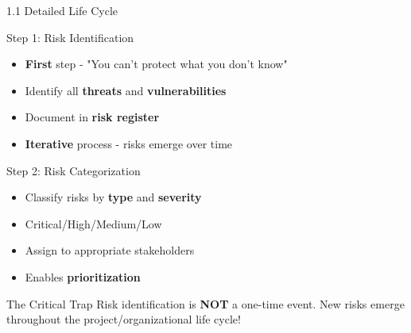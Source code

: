 \documentclass[9pt]{beamer}  %
\begin{document}
	\begin{frame}{1.1 Detailed Life Cycle}
		\begin{block}{Step 1: Risk Identification}
			\begin{itemize}
				\item \textbf{First} step - "You can't protect what you don't know"
				\item Identify all \textbf{threats} and \textbf{vulnerabilities}
				\item Document in \textbf{risk register}
				\item \textbf{Iterative} process - risks emerge over time
			\end{itemize}
		\end{block}
		
		\begin{block}{Step 2: Risk Categorization}
			\begin{itemize}
				\item Classify risks by \textbf{type} and \textbf{severity}
				\item Critical/High/Medium/Low
				\item Assign to appropriate stakeholders
				\item Enables \textbf{prioritization}
			\end{itemize}
		\end{block}
		
		\begin{alertblock}{The Critical Trap}
			Risk identification is \textbf{NOT} a one-time event. New risks emerge throughout the project/organizational life cycle!
		\end{alertblock}
	\end{frame}
	
\end{document}
